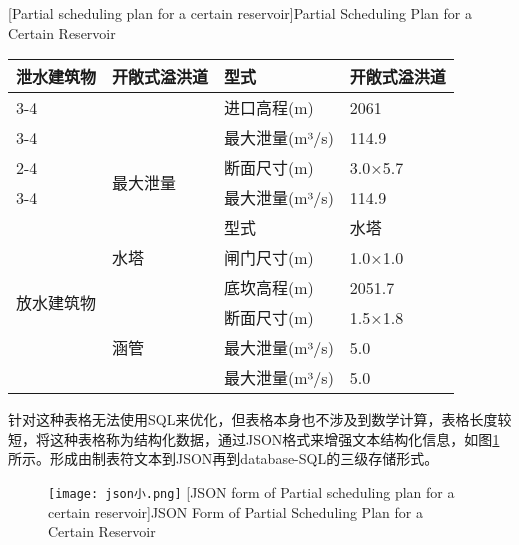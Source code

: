 \begin{table}[htbp]
    \centering
    [Partial scheduling plan for a certain reservoir]{Partial Scheduling Plan for a Certain Reservoir}
    \label{tab:reservoir-scheduling}
    \begin{tabular}{|l|l|l|l|}
      \hline
      \multirow{6}{*}{泄水建筑物} & \multirow{3}{*}{开敞式溢洪道} & 型式 & 开敞式溢洪道 \\
      \cline{3-4}
      & & 进口高程(m) & 2061 \\
      \cline{3-4}
      & & 最大泄量(m³/s) & 114.9 \\
      \cline{2-4}
      & \multirow{2}{*}{最大泄量} & 断面尺寸(m) & 3.0×5.7 \\
      \cline{3-4}
      & & 最大泄量(m³/s) & 114.9 \\
      \hline
      \multirow{6}{*}{放水建筑物} & \multirow{3}{*}{水塔} & 型式 & 水塔 \\
      \cline{3-4}
      & & 闸门尺寸(m) & 1.0×1.0 \\
      \cline{3-4}
      & & 底坎高程(m) & 2051.7 \\
      \cline{2-4}
      & \multirow{3}{*}{涵管} & 断面尺寸(m) & 1.5×1.8 \\
      \cline{3-4}
      & & 最大泄量(m³/s) & 5.0 \\
      \cline{3-4}
      & & 最大泄量(m³/s) & 5.0 \\
      \hline
    \end{tabular}
  \end{table}
针对这种表格无法使用SQL来优化，但表格本身也不涉及到数学计算，表格长度较短，将这种表格称为结构化数据，通过JSON格式来增强文本结构化信息，如图\ref{fig:JSON}所示。形成由制表符文本到JSON再到database-SQL的三级存储形式。

\begin{figure}[!htb]
    \centering
    \texttt{[image: json小.png]}
    [JSON form of Partial scheduling plan for a certain reservoir]{JSON Form of Partial Scheduling Plan for a Certain Reservoir}
    \label{fig:JSON} 
\end{figure}
